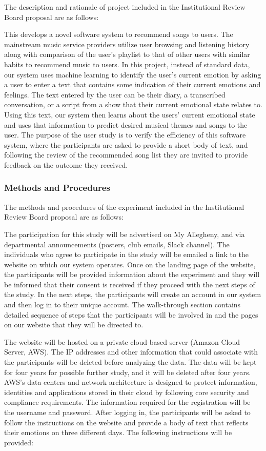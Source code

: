 The description and rationale of project included in the Institutional Review
Board proposal are as follows:

This develops a novel software system to recommend songs to users. The mainstream
music service providers utilize user browsing and listening history along with
comparison of the user’s playlist to that of other users with similar habits to
recommend music to users.  In this project, instead of standard data, our system
uses machine learning to identify the user's current emotion by asking a user to
enter a text that contains some indication of their current emotions and feelings.
The text entered by the user can be their diary, a transcribed conversation, or
a script from a show that their current emotional state relates to. Using this
text, our system then learns about the users’ current emotional state and uses
that information to predict desired musical themes and songs to the user. The
purpose of the user study is to verify the efficiency of this software system,
where the participants are asked to provide a short body of text, and following
the review of the recommended song list they are invited to provide feedback on
the outcome they received.

\subsubsection{Methods and Procedures}

The methods and procedures of the experiment included in the Institutional Review
Board proposal are as follows:

The participation for this study will be advertised on My Allegheny, and via
departmental announcements (posters, club emails, Slack channel). The individuals
who agree to participate in the study will be emailed a link to the website on
which our system operates. Once on the landing page of the website, the participants
will be provided information about the experiment and they will be informed that
their consent is received if they proceed with the next steps of the study.  In
the next steps, the participants will create an account in our system and then
log in to their unique account. The walk-through section contains detailed sequence
of steps that the participants will be involved in and the pages on our website
that they will be directed to.

The website will be hosted on a private cloud-based server (Amazon Cloud Server, AWS).
The IP addresses and other information that could associate with the participants
will be deleted before analyzing the data. The data will be kept for four years
for possible further study, and it will be deleted after four years. AWS’s data
centers and network architecture is designed to protect information, identities
and applications stored in their cloud by following core security and compliance
requirements. The information required for the registration will be the username
and password. After logging in, the participants will be asked to follow the
instructions on the website and provide a body of text that reflects their emotions
on three different days. The following instructions will be provided:

